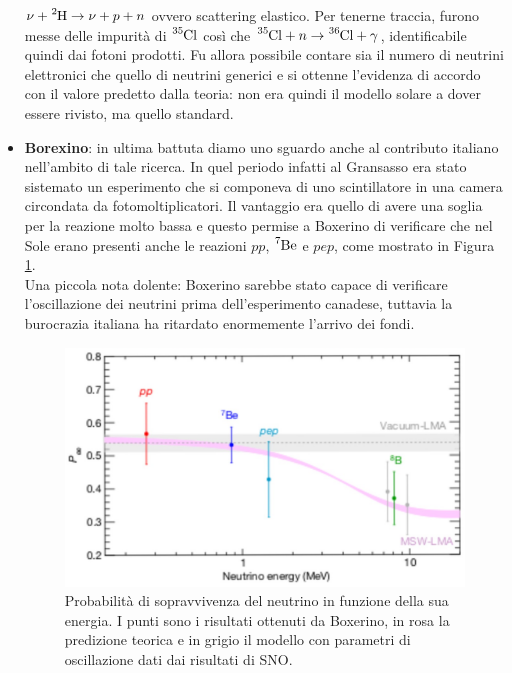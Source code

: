\begin{itemize}
    $\nu + \ce{^2H} \to \nu + p +n$ ovvero scattering elastico. Per tenerne traccia, furono messe delle impurità di $\ce{^{35}Cl}$ così che $\ce{^{35}Cl}+n\to \ce{^{36}Cl +\gamma}$, identificabile quindi dai fotoni prodotti. Fu allora possibile contare sia il numero di neutrini elettronici che quello di neutrini generici e si ottenne l'evidenza di accordo con il valore predetto dalla teoria: non era quindi il modello solare a dover essere rivisto, ma quello standard.
    \item \textbf{Borexino}: in ultima battuta diamo uno sguardo anche al contributo italiano nell'ambito di tale ricerca. In quel periodo infatti al Gransasso era stato sistemato un esperimento che si componeva di uno scintillatore in una camera circondata da fotomoltiplicatori. Il vantaggio era quello di avere una soglia per la reazione molto bassa e questo permise a Boxerino di verificare che nel Sole erano presenti anche le reazioni $pp$, $\ce{^7Be}$ e $pep$, come mostrato in Figura \ref{0322_risultati}.\\
    \noindent Una piccola nota dolente: Boxerino sarebbe stato capace di verificare l'oscillazione dei neutrini prima dell'esperimento canadese, tuttavia la burocrazia italiana ha ritardato enormemente l'arrivo dei fondi.
    \begin{figure}[ph]
        \centering
        \includegraphics[scale=0.2]{Immagini/0322_energianu.png}
        \caption{Probabilità di sopravvivenza del neutrino in funzione della sua energia. I punti sono i risultati ottenuti da Boxerino, in rosa la predizione teorica e in grigio il modello con parametri di oscillazione dati dai risultati di SNO.}
        \label{0322_risultati}
    \end{figure}
    \begin{figure}[p!h]

\end{figure}
\end{itemize}
